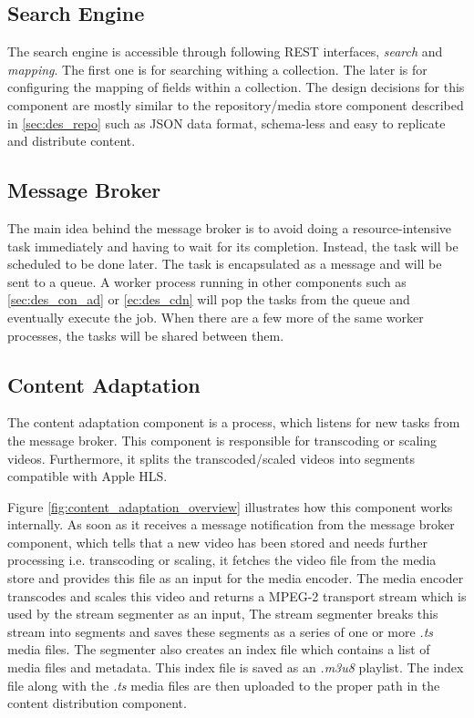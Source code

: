 \subsection{Search Engine\label{sec:des_se_en}}
The search engine is accessible through following \ac{REST} interfaces, \textit{search} and \textit{mapping}. The first one is for searching withing a collection. The later is for configuring the mapping of fields within a collection. The design decisions for this component are mostly similar to the repository/media store component described in \ref{sec:des_repo} such as \ac{JSON} data format, schema-less and easy to replicate and distribute content.

\subsection{Message Broker\label{sec:des_worker_queue}}
The main idea behind the message broker is to avoid doing a resource-intensive task immediately and having to wait for its completion. Instead, the task will be scheduled to be done later. The task is encapsulated as a message and  will be sent to a queue. A worker process running in other components such as \ref{sec:des_con_ad} or \ref{ec:des_cdn} will pop the tasks from the queue and eventually execute the job. When there are a few more of the same worker processes, the tasks will be shared between them.


\subsection{Content Adaptation\label{sec:des_con_ad}}
The content adaptation component is a process, which listens for new tasks from the message broker. This component is responsible for transcoding or scaling videos. Furthermore, it splits the transcoded/scaled videos into segments compatible with  Apple \ac{HLS}. %

Figure \ref{fig:content_adaptation_overview} illustrates how this component works internally. As soon as it receives a message notification from the message broker component, which tells that a new video has been stored and needs further processing i.e. transcoding or scaling, it fetches the video file from the media store and provides this file as an input for the media encoder. The media encoder transcodes and scales this video and returns a MPEG-2 transport stream which is used by the stream segmenter as an input, The stream segmenter breaks this stream into segments and saves these segments as a series of one or more \textit{.ts} media files. The segmenter also creates an index file which contains a list of media files and metadata. This index file is saved as an \textit{.m3u8} playlist. The index file along with the \textit{.ts} media files are then uploaded to the proper path in the content distribution component.

